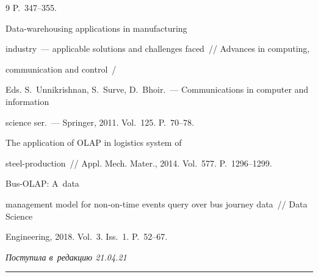 {{\begin{thebibliography}{9}
P.~347--355.




 Data-warehousing applications in manufacturing 


industry~--- applicable solutions and challenges faced~/\!\!/ Advances in computing, 


communication and control~/ 


Eds. S.~Unnikrishnan, S.~Surve, D.~Bhoir.~--- Communications in computer and information 


science ser.~--- Springer, 2011. Vol.~125. P.~70--78.




 The application of OLAP in logistics system of  


steel-production~/\!\!/ Appl. Mech. Mater., 2014. Vol.~577. P.~1296--1299.




 Bus-OLAP: A~data 


management model for non-on-time events query over bus journey data~/\!\!/ Data Science 


Engineering, 2018. Vol.~3. Iss.~1. P.~52--67.


       \end{thebibliography}


} }











\vspace*{-3pt}





\hfill{\small\textit{Поступила в~редакцию 21.04.21}}





\vspace*{8pt}





\hrule





\vspace*{2pt}










